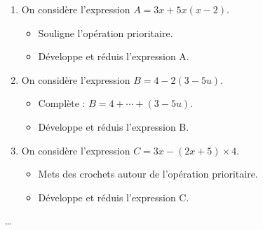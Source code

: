 \begin{exercice*}
    \begin{enumerate}
        \item On considère l'expression $A = 3x + 5x(x - 2)$.

              \begin{itemize}
                  \item Souligne l'opération prioritaire.
                  \item Développe et réduis l'expression A.
              \end{itemize}

        \item On considère l'expression $B = 4 - 2(3 - 5u)$.

              \begin{itemize}
                  \item Complète : $B = 4 + \cdots + (3 - 5u)$.
                  \item Développe et réduis l'expression B.
              \end{itemize}

        \item On considère l'expression $C = 3x - (2x + 5) \times 4$.

              \begin{itemize}
                  \item Mets des crochets autour de l'opération prioritaire.
                  \item Développe et réduis l'expression C.
              \end{itemize}
    \end{enumerate}
\end{exercice*}
\begin{corrige}
    \dots
\end{corrige}

